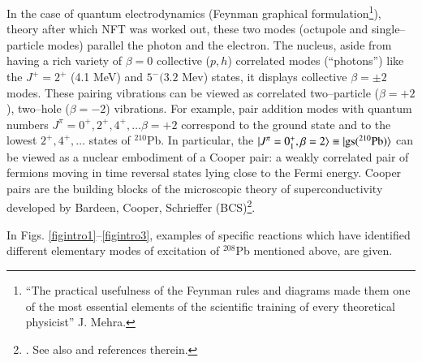 In the case of quantum electrodynamics (Feynman graphical formulation\footnote{``The practical usefulness of the Feynman rules and diagrams made them one of the most essential elements of the scientific training of every theoretical physicist'' J. Mehra.}), theory after which NFT was worked out, these two modes (octupole and single--particle modes) parallel the photon and the electron. The nucleus, aside from having a rich variety of $\beta=0$ collective ($p,h$) correlated modes (``photons'') like the $J^+=2^+$ (4.1 MeV) and $5^-(3.2$ Mev) states, it displays collective $\beta=\pm2$ modes. These pairing vibrations can be viewed as correlated two--particle ($\beta=+2$), two--hole ($\beta=-2$) vibrations. For example, pair addition modes with quantum numbers $J^\pi=0^+,2^+,4^+,\dots\beta=+2$ correspond to the ground state and to the lowest $2^+,4^+,\dots$ states of $^{210}$Pb. In particular,  the $|{J^\pi=0^+_1,\beta=2} \rangle\equiv |{\text{gs}(^{210}\text{Pb})} \rangle$ can be viewed as a nuclear embodiment of a Cooper pair: a weakly correlated pair of fermions moving in time reversal states lying close to the Fermi energy. Cooper pairs are the building blocks of the microscopic theory of superconductivity developed by Bardeen, Cooper, Schrieffer (BCS)\footnote{\cite{Bardeen:57a,Bardeen:57b}. See also \cite{Brink:05} and references therein.}.


In Figs. \ref{figintro1}--\ref{figintro3}, examples of specific reactions which have identified different elementary modes of excitation of $^{208}$Pb mentioned above, are given.

